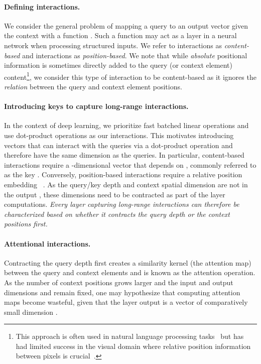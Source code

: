 \documentclass{article} \usepackage{iclr2021_conference,times}
\begin{document}
\vspace{-0.1cm}
\paragraph{Defining interactions.}
We consider the general problem of mapping a query  to an output vector  given the context  with a function .
Such a function may act as a layer in a neural network when processing structured inputs.
We refer to  interactions as \emph{content-based} and  interactions as \emph{position-based}.
We note that while \emph{absolute} positional information is sometimes directly added to the query (or context element) content\footnote{This approach is often used in natural language processing tasks~\citep{vaswani2017attention} but has had limited success in the visual domain where relative position information between pixels is crucial~\citep{bello2019aacn}.}, we consider this type of interaction to be content-based as it ignores the \emph{relation}  between the query and context element positions.

\vspace{-0.1cm}
\paragraph{Introducing keys to capture long-range interactions.}
In the context of deep learning, we prioritize fast batched linear operations and use dot-product operations as our interactions.
This motivates introducing vectors that can interact with the queries via a dot-product operation and therefore have the same dimension as the queries.
In particular, content-based interactions  require a -dimensional vector that depends on , commonly referred to as the key .
Conversely, position-based interactions  require a relative position embedding ~\citep{shaw2018relative}.
As the query/key depth  and context spatial dimension  are not in the output , these dimensions need to be contracted as part of the layer computations.
\emph{Every layer capturing long-range interactions can therefore be characterized based on whether it contracts the query depth or the context positions first.}

\vspace{-0.1cm}
\paragraph{Attentional interactions.}
Contracting the query depth first creates a similarity kernel (the attention map) between the query and context elements and is known as the attention operation.
As the number of context positions  grows larger and the input and output dimensions  and  remain fixed, one may hypothesize that computing attention maps become wasteful, given that the layer output is a vector of comparatively small dimension .
\end{document}
